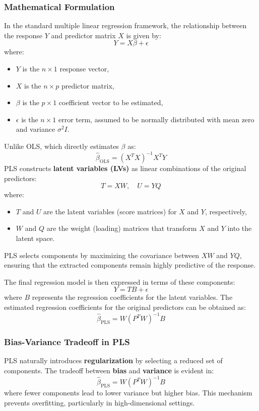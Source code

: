 \documentclass[11pt,twoside,a4paper]{article}
\begin{document}
\subsubsection{Mathematical Formulation}
In the standard multiple linear regression framework, the relationship between the response \( Y \) and predictor matrix \( X \) is given by:
\[
Y = X \beta + \epsilon
\]
where:
\begin{itemize}
    \item \( Y \) is the \( n \times 1 \) response vector,
    \item \( X \) is the \( n \times p \) predictor matrix,
    \item \( \beta \) is the \( p \times 1 \) coefficient vector to be estimated,
    \item \( \epsilon \) is the \( n \times 1 \) error term, assumed to be normally distributed with mean zero and variance \( \sigma^2 I \).
\end{itemize}

Unlike OLS, which directly estimates \( \beta \) as:
\[
\hat{\beta}_{\text{OLS}} = (X^T X)^{-1} X^T Y
\]
PLS constructs \textbf{latent variables (LVs)} as linear combinations of the original predictors:
\[
T = XW, \quad U = YQ
\]
where:
\begin{itemize}
    \item \( T \) and \( U \) are the latent variables (score matrices) for \( X \) and \( Y \), respectively,
    \item \( W \) and \( Q \) are the weight (loading) matrices that transform \( X \) and \( Y \) into the latent space.
\end{itemize}

PLS selects components by maximizing the covariance between \( XW \) and \( YQ \), ensuring that the extracted components remain highly predictive of the response.

The final regression model is then expressed in terms of these components:
\[
Y = T B + \epsilon
\]
where \( B \) represents the regression coefficients for the latent variables. The estimated regression coefficients for the original predictors can be obtained as:
\[
\hat{\beta}_{\text{PLS}} = W (P^T W)^{-1} B
\]

\subsubsection{Bias-Variance Tradeoff in PLS}
PLS naturally introduces \textbf{regularization} by selecting a reduced set of components. The tradeoff between \textbf{bias} and \textbf{variance} is evident in:
\[
\hat{\beta}_{\text{PLS}} = W (P^T W)^{-1} B
\]
where fewer components lead to lower variance but higher bias. This mechanism prevents overfitting, particularly in high-dimensional settings.
\end{document}
